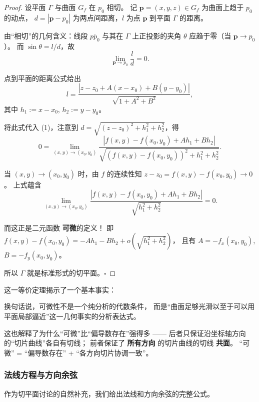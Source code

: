 \documentclass[lang=cn,11pt]{elegantbook}
\begin{document}
\begin{proof}
设平面 $\Gamma$ 与曲面 $G_f$ 在 $p_0$ 相切。
记 $\boldsymbol{p}=(x,y,z)\in G_f$ 为曲面上趋于 $p_0$ 的动点，
$d=|\boldsymbol{p}-p_0|$ 为两点间距离，$l$ 为点 $\boldsymbol{p}$ 到平面 $\Gamma$ 的距离。

由“相切”的几何含义：线段 $\overline{pp_0}$ 与其在 $\Gamma$ 上正投影的夹角
$\theta$ 应趋于零（当 $\boldsymbol{p}\to p_0$）。
而 $\sin\theta=l/d$，故
\[
\lim_{\boldsymbol{p}\to p_0}\frac{l}{d}=0.
\tag{1}
\]

点到平面的距离公式给出
\[
l=\frac{|z-z_0+A(x-x_0)+B(y-y_0)|}{\sqrt{1+A^2+B^2}},
\]
其中 $h_1:=x-x_0$, $h_2:=y-y_0$。

将此式代入 (1)，注意到 $d=\sqrt{(z-z_0)^2+h_1^2+h_2^2}$，得
\[
0=\lim_{(x,y)\to(x_0,y_0)}
\frac{|f(x,y)-f(x_0,y_0)+Ah_1+Bh_2|}
     {\sqrt{(f(x,y)-f(x_0,y_0))^2+h_1^2+h_2^2}}.
\]

当 $(x,y)\to(x_0,y_0)$ 时，由 $f$ 的连续性知 $z-z_0=f(x,y)-f(x_0,y_0)\to 0$。
上式蕴含
\[
\lim_{(x,y)\to(x_0,y_0)}
\frac{|f(x,y)-f(x_0,y_0)+Ah_1+Bh_2|}
     {\sqrt{h_1^2+h_2^2}}=0.
\]

而这正是二元函数 \textbf{可微}的定义！
即
$f(x,y)-f(x_0,y_0)=-Ah_1-Bh_2+o\left(\sqrt{h_1^2+h_2^2}\right)$，
且有 $A=-f_x(x_0,y_0)$, $B=-f_y(x_0,y_0)$。

所以 $\Gamma$ 就是标准形式的切平面。\hfill$\square$
\end{proof}

\begin{note}
这一等价定理揭示了一个基本事实：

\begin{center}
\end{center}

换句话说，可微性不是一个纯分析的代数条件，
而是“曲面足够光滑以至于可以用平面局部逼近”这一几何事实的分析表达式。

这也解释了为什么“可微”比“偏导数存在”强得多 ——
后者只保证沿坐标轴方向的“切片曲线”各自有切线；
前者保证了 \textbf{所有方向} 的切片曲线的切线 \textbf{共面}。
“可微” = “偏导数存在” + “各方向切片协调一致”。
\end{note}

\subsubsection*{法线方程与方向余弦}

作为切平面讨论的自然补充，我们给出法线和方向余弦的完整公式。
\end{document}
